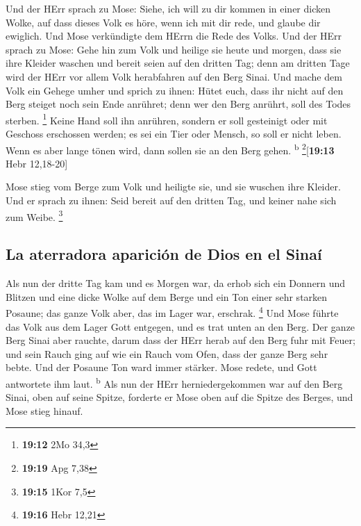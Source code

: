  Und der HErr sprach zu Mose: Siehe, ich will zu dir
kommen in einer dicken Wolke, auf dass dieses Volk es höre, wenn ich mit
dir rede, und glaube dir ewiglich. Und Mose verkündigte dem HErrn die
Rede des Volks.  Und der HErr sprach zu Mose: Gehe hin
zum Volk und heilige sie heute und morgen, dass sie ihre Kleider waschen
 und bereit seien auf den dritten Tag; denn am dritten
Tage wird der HErr vor allem Volk herabfahren auf den Berg Sinai.
 Und mache dem Volk ein Gehege umher und sprich zu ihnen:
Hütet euch, dass ihr nicht auf den Berg steiget noch sein Ende anrühret;
denn wer den Berg anrührt, soll des Todes sterben. \footnote{\textbf{19:12}
  2Mo 34,3}  Keine Hand soll ihn anrühren, sondern er
soll gesteinigt oder mit Geschoss erschossen werden; es sei ein Tier
oder Mensch, so soll er nicht leben. Wenn es aber lange tönen wird, dann
sollen sie an den Berg gehen. \textsuperscript{b}
\footnote{\textbf{19:19} Apg 7,38}{[}\textbf{19:13} Hebr 12,18-20{]}

 Mose stieg vom Berge zum Volk und heiligte sie, und sie
wuschen ihre Kleider.  Und er sprach zu ihnen: Seid
bereit auf den dritten Tag, und keiner nahe sich zum Weibe. \footnote{\textbf{19:15}
  1Kor 7,5}

\hypertarget{la-aterradora-apariciuxf3n-de-dios-en-el-sinauxed}{%
\subsection{La aterradora aparición de Dios en el
Sinaí}\label{la-aterradora-apariciuxf3n-de-dios-en-el-sinauxed}}

 Als nun der dritte Tag kam und es Morgen war, da erhob
sich ein Donnern und Blitzen und eine dicke Wolke auf dem Berge und ein
Ton einer sehr starken Posaune; das ganze Volk aber, das im Lager war,
erschrak. \footnote{\textbf{19:16} Hebr 12,21}  Und Mose
führte das Volk aus dem Lager Gott entgegen, und es trat unten an den
Berg.  Der ganze Berg Sinai aber rauchte, darum dass der
HErr herab auf den Berg fuhr mit Feuer; und sein Rauch ging auf wie ein
Rauch vom Ofen, dass der ganze Berg sehr bebte.  Und der
Posaune Ton ward immer stärker. Mose redete, und Gott antwortete ihm
laut. \textsuperscript{b}  Als nun der HErr
herniedergekommen war auf den Berg Sinai, oben auf seine Spitze,
forderte er Mose oben auf die Spitze des Berges, und Mose stieg hinauf.

